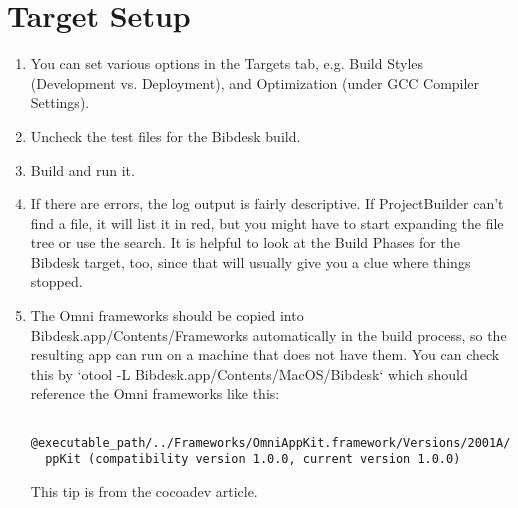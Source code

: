 \documentclass[11pt]{article}
\begin{document}
\section{Target Setup}
\begin{enumerate}
\item You can set various options in the Targets tab, e.g. Build Styles (Development vs. Deployment),
and Optimization (under GCC Compiler Settings).
\item Uncheck the test files for the Bibdesk build.
\item Build and run it.
\item If there are errors, the log output is fairly descriptive.  If ProjectBuilder can't find a
file, it will list it in red, but you might have to start expanding the file tree or use the
search.  It is helpful to look at the Build Phases for the Bibdesk target, too, since that will
usually give you a clue where things stopped.
\item The Omni frameworks should be copied into Bibdesk.app/Contents/Frameworks automatically in the
build process, so the resulting app can run on a machine that does not have them.  You can check
this by `otool -L Bibdesk.app/Contents/MacOS/Bibdesk` which should reference the Omni frameworks
like this:  \begin{verbatim}
  @executable_path/../Frameworks/OmniAppKit.framework/Versions/2001A/OmniA
  ppKit (compatibility version 1.0.0, current version 1.0.0)
\end{verbatim}  This tip is from the cocoadev article.
\end{enumerate}


 
\end{document}

